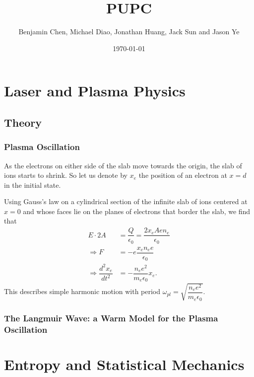 \documentclass{paper}
\begin{document}
\setcounter{page}{-1}

\title{PUPC}
\author{Benjamin Chen, Michael Diao, Jonathan Huang, Jack Sun and Jason Ye}
\date{\today}
\maketitle

\tableofcontents
\fancyfoot{}

\newpage

\chapter{Laser and Plasma Physics}

\section{Theory}
\subsection{Plasma Oscillation}

As the electrons on either side of the slab move towards the origin, the slab of ions starts to shrink. So let us denote by $x_e$ the position of an electron at $x = d$ in the initial state.

Using Gauss's law on a cylindrical section of the infinite slab of ions centered at $x=0$ and whose faces lie on the planes of electrons that border the slab, we find that
\begin{align*}
    E\cdot 2A &= \dfrac{Q}{\epsilon_0} = \dfrac{2x_eAen_e}{\epsilon_0}\\
    \Rightarrow  F &= -e\dfrac{x_en_ee}{\epsilon_0}\\
    \Rightarrow \dfrac{d^2x_e}{dt^2} &= -\dfrac{n_ee^2}{m_e\epsilon_0}x_e.
\end{align*}
This describes simple harmonic motion with period $\omega_{pl} = \sqrt{\dfrac{n_ee^2}{m_e\epsilon_0}}$.

\subsection{The Langmuir Wave: a Warm Model for the Plasma Oscillation}



\chapter{Entropy and Statistical Mechanics}
\end{document}
